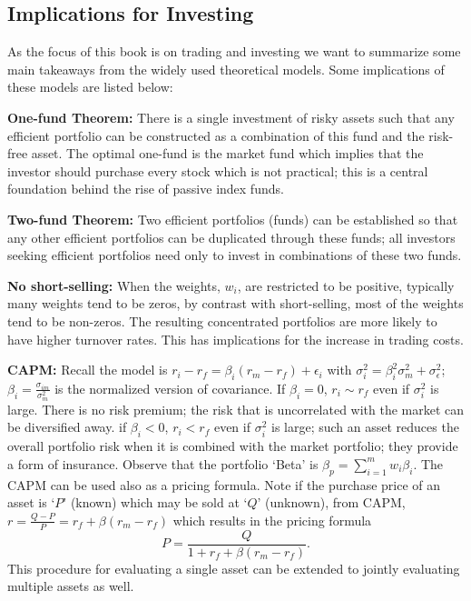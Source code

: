        
\subsection{Implications for Investing}

As the focus of this book is on trading and investing we want to summarize some main takeaways from the widely used theoretical models. Some implications of these models are listed below: \twomedskip


\noindent\textbf{One-fund Theorem:} There is a single investment of risky assets such that any efficient portfolio can be constructed as a combination of this fund and the risk-free asset. The optimal one-fund is the market fund which implies that the investor should purchase every stock which is not practical; this is a central foundation behind the rise of passive index funds. \twomedskip


\noindent\textbf{Two-fund Theorem:} Two efficient portfolios (funds) can be established so that any other efficient portfolios can be duplicated through these funds; all investors seeking efficient portfolios need only to invest in combinations of these two funds. \twomedskip


\noindent\textbf{No short-selling:} When the weights, $w_i$, are restricted to be positive, typically many weights tend to be zeros, by contrast with short-selling, most of the weights tend to be non-zeros. The resulting concentrated portfolios are more likely to have higher turnover rates. This has implications for the increase in trading costs. \twomedskip


\noindent\textbf{CAPM:} Recall the model is $r_i - r_f= \beta_i (r_m-r_f)+\epsilon_i$ with $\sigma_i^2= \beta_i^2\sigma^2_m + \sigma_\epsilon^2$; $\beta_i= \frac{\sigma_{im}}{\sigma_m^2}$ is the normalized version of covariance. If $\beta_i= 0$, $r_i \sim r_f$ even if $\sigma_i^2$ is large. There is no risk premium; the risk that is uncorrelated with the market can be diversified away. if $\beta_i < 0$, $r_i<r_f$ even if $\sigma_i^2$ is large; such an asset reduces the overall portfolio risk when it is combined with the market portfolio; they provide a form of insurance. Observe that the portfolio `Beta' is $\beta_p= \sum_{i=1}^m w_i \beta_i$. The CAPM can be used also as a pricing formula. Note if the purchase price of an asset is `$P$' (known) which may be sold at `$Q$' (unknown), from CAPM, $r= \frac{Q-P}{P}= r_f+\beta(r_m - r_f)$ which results in the pricing formula
	\begin{equation}\label{eqn:pricing}
	P=\dfrac{Q}{1 + r_f + \beta(r_m - r_f)}.
	\end{equation}
This procedure for evaluating a single asset can be extended to jointly evaluating multiple assets as well. \twomedskip


